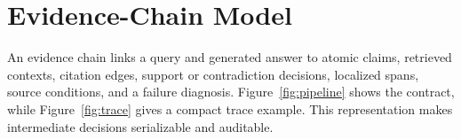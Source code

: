 \section{Evidence-Chain Model}
An evidence chain links a query and generated answer to atomic claims,
retrieved contexts, citation edges, support or contradiction decisions,
localized spans, source conditions, and a failure diagnosis. Figure~\ref{fig:pipeline}
shows the contract, while Figure~\ref{fig:trace} gives a compact trace example.
This representation makes intermediate decisions serializable and auditable.



